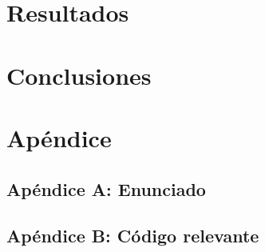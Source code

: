 \documentclass[10pt, a4paper, english, spanish]{article}
\begin{document}
\section{Resultados}

\clearpage

%

\section{Conclusiones}

\clearpage

\section{Apéndice}
\subsection{Apéndice A: Enunciado}\label{enunciado}
  
\clearpage
\subsection{Apéndice B: Código relevante}
  

\end{document}
